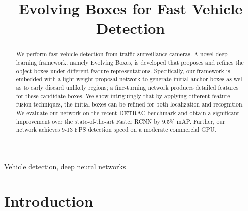 \documentclass[5pt]{article}
\begin{document}
\sloppy

\title{Evolving Boxes for Fast Vehicle Detection}
\address{$^1$Shanghai Key Lab of Intelligent Information Processing, School of Computer Science, \\Fudan University, Shanghai, China\\
$^2$Shanghai Advanced Research Institute, Chinese Academy of Sciences, Shanghai, China\\
$^3$School of Computer Science and Engineering, University of Washington, Seattle, USA\\
wangli16@fudan.edu.cn, luyao@cs.washington.edu,\\ \{wang\_hong,zhengyb,yeh\}@sari.ac.cn, xyxue@fudan.edu.cn}
\maketitle

\begin{abstract}
We perform fast vehicle detection from traffic surveillance cameras. A novel deep learning framework, namely Evolving Boxes, is developed that proposes and refines the object boxes under different feature representations. Specifically, our framework is embedded with a light-weight proposal network to generate initial anchor boxes as well as to early discard unlikely regions; a fine-turning network produces detailed features for these candidate boxes. We show intriguingly that by applying different feature fusion techniques, the initial boxes can be refined for both localization and recognition. We evaluate our network on the recent DETRAC benchmark and obtain a significant improvement over the state-of-the-art Faster RCNN by 9.5\% mAP. Further, our network achieves 9-13 FPS detection speed on a moderate commercial GPU.
\end{abstract}
\begin{keywords}
Vehicle detection, deep neural networks
\end{keywords}

\section{Introduction}
\label{sec:intro}
\end{document}
